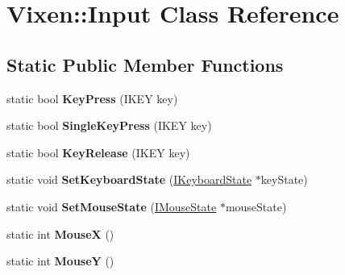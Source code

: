 \hypertarget{class_vixen_1_1_input}{}\section{Vixen\+:\+:Input Class Reference}
\label{class_vixen_1_1_input}
\subsection*{Static Public Member Functions}
\begin{DoxyCompactItemize}
\item 
\hypertarget{class_vixen_1_1_input_ac32d4f96209f581b85dc24018d11f735}{}static bool {\bfseries Key\+Press} (I\+K\+E\+Y key)\label{class_vixen_1_1_input_ac32d4f96209f581b85dc24018d11f735}

\item 
\hypertarget{class_vixen_1_1_input_a8dba81728880eca003a9292635855f60}{}static bool {\bfseries Single\+Key\+Press} (I\+K\+E\+Y key)\label{class_vixen_1_1_input_a8dba81728880eca003a9292635855f60}

\item 
\hypertarget{class_vixen_1_1_input_a8c101971395b8980dcf018e176a2b76d}{}static bool {\bfseries Key\+Release} (I\+K\+E\+Y key)\label{class_vixen_1_1_input_a8c101971395b8980dcf018e176a2b76d}

\item 
\hypertarget{class_vixen_1_1_input_af542e3bb3572aeda86ffb422fca75cfa}{}static void {\bfseries Set\+Keyboard\+State} (\hyperlink{class_vixen_1_1_i_keyboard_state}{I\+Keyboard\+State} $\ast$key\+State)\label{class_vixen_1_1_input_af542e3bb3572aeda86ffb422fca75cfa}

\item 
\hypertarget{class_vixen_1_1_input_ab1d9b11fa3889c0e92b0715055ad75ca}{}static void {\bfseries Set\+Mouse\+State} (\hyperlink{class_vixen_1_1_i_mouse_state}{I\+Mouse\+State} $\ast$mouse\+State)\label{class_vixen_1_1_input_ab1d9b11fa3889c0e92b0715055ad75ca}

\item 
\hypertarget{class_vixen_1_1_input_a103f683457dcd5419021993c47ee8284}{}static int {\bfseries Mouse\+X} ()\label{class_vixen_1_1_input_a103f683457dcd5419021993c47ee8284}

\item 
\hypertarget{class_vixen_1_1_input_a379c132c66c72d4546cd0ef676b4d717}{}static int {\bfseries Mouse\+Y} ()\label{class_vixen_1_1_input_a379c132c66c72d4546cd0ef676b4d717}


\end{DoxyCompactItemize}
